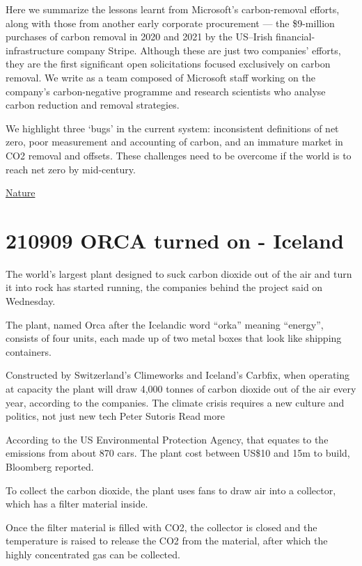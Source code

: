 \documentclass[
]{book}
\begin{document}
Here we summarize the lessons learnt from Microsoft's carbon-removal efforts, along with those from another early corporate procurement --- the \$9-million purchases of carbon removal in 2020 and 2021 by the US--Irish financial-infrastructure company Stripe. Although these are just two companies' efforts, they are the first significant open solicitations focused exclusively on carbon removal. We write as a team composed of Microsoft staff working on the company's carbon-negative programme and research scientists who analyse carbon reduction and removal strategies.

We highlight three `bugs' in the current system: inconsistent definitions of net zero, poor measurement and accounting of carbon, and an immature market in CO2 removal and offsets. These challenges need to be overcome if the world is to reach net zero by mid-century.

\href{https://www.nature.com/articles/d41586-021-02606-3}{Nature}

\hypertarget{orca-turned-on---iceland}{%
\section{210909 ORCA turned on - Iceland}\label{orca-turned-on---iceland}}

The world's largest plant designed to suck carbon dioxide out of the air and turn it into rock has started running, the companies behind the project said on Wednesday.

The plant, named Orca after the Icelandic word ``orka'' meaning ``energy'', consists of four units, each made up of two metal boxes that look like shipping containers.

Constructed by Switzerland's Climeworks and Iceland's Carbfix, when operating at capacity the plant will draw 4,000 tonnes of carbon dioxide out of the air every year, according to the companies.
The climate crisis requires a new culture and politics, not just new tech
Peter Sutoris
Read more

According to the US Environmental Protection Agency, that equates to the emissions from about 870 cars. The plant cost between US\$10 and 15m to build, Bloomberg reported.

To collect the carbon dioxide, the plant uses fans to draw air into a collector, which has a filter material inside.

Once the filter material is filled with CO2, the collector is closed and the temperature is raised to release the CO2 from the material, after which the highly concentrated gas can be collected.
\end{document}
